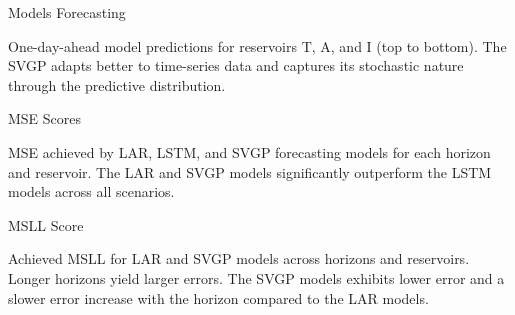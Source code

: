 \begin{frame}{Models Forecasting}
	\begin{figure}[htbp]
		\centering
		\setlength\figurewidth{\columnwidth} 
		\setlength{}
		
		\hfill
		\hfill
		
		
	\end{figure}
	One-day-ahead model predictions for reservoirs T, A, and I (top to bottom). The SVGP adapts better to time-series data and captures its stochastic nature through the predictive distribution.
\end{frame}


\begin{frame}{MSE Scores}
	\begin{figure}[htbp]
		\setlength{} 
		\setlength{}
		\subfloat[LAR.]{}\hspace{-1.5em}
		\subfloat[LSTM.]{}\hspace{-1.5em}
		\subfloat[SVGP.]{}
	\end{figure}
	\vspace{-1.0em}
	MSE achieved by LAR, LSTM, and SVGP forecasting models for each horizon and reservoir. The LAR and SVGP models significantly outperform the LSTM models across all scenarios.
\end{frame}

\begin{frame}{MSLL Score}
	\begin{figure}[htbp]
		\setlength{} 
		\setlength{}
		\subfloat[LAR.]{}\hspace{-1.5em}
		\subfloat[SVGP.]{}
	\end{figure}
	\vspace{-1.0em}
	Achieved MSLL for LAR and SVGP models across horizons and reservoirs. Longer horizons yield larger errors. The SVGP models exhibits lower error and a slower error increase with the horizon compared to the LAR models.
\end{frame}

